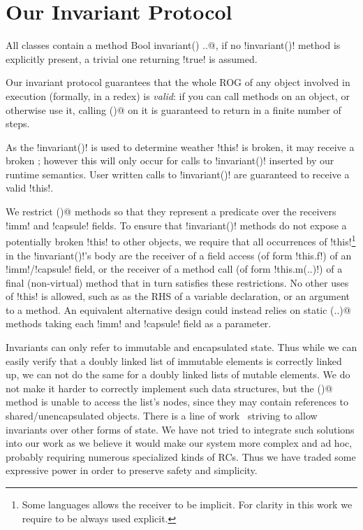 \section{Our Invariant Protocol}
\label{s:protocol}
All classes contain a \Q@read method Bool invariant() {..}@, if no \Q!invariant()! method is explicitly present, a trivial one returning \Q!true! is assumed.

Our invariant protocol guarantees that the whole ROG of any object involved in execution (formally, in a redex) is \emph{valid}: if you can call methods on an object, or otherwise use it, calling \Q@invariant()@ on it is guaranteed to return \Q@true@ in a finite number of steps.

As the \Q!invariant()! is used to determine weather \Q!this! is broken, it may receive a broken \Q@this@; however this will only occur for calls to \Q!invariant()! inserted by our runtime semantics. User written calls to \Q!invariant()! are guaranteed to receive a valid \Q!this!.

We restrict \Q@invariant()@ methods so that they represent a predicate over the receivers \Q!imm! and \Q!capsule! fields. To ensure that \Q!invariant()! methods do not expose a potentially broken \Q!this! to other objects, we require that all occurrences of \Q!this!\footnote{Some languages allows the \Q@this@ receiver to be implicit. For clarity in this work we require \Q@this@ to be always used explicit.} 
in the \Q!invariant()!'s body are the receiver of a field access (of form \Q!this.f!) of an \Q!imm!/\Q!capsule! field, or the receiver of a method call (of form \Q!this.m(..)!) of a final (non-virtual) method that in turn satisfies these restrictions. No other uses of \Q!this! is allowed, such as as the RHS of a variable declaration, or an argument to a method.
An equivalent alternative design could instead relies on static \Q@invariant(..)@ methods taking each \Q!imm! and \Q!capsule! field as a parameter.

Invariants can only refer to immutable and encapsulated state. Thus while we can easily verify that a doubly linked list of immutable elements
is correctly linked up,
we can not do the same for a doubly linked lists of mutable elements. We do not make it harder to correctly implement such data structures, 
but the \Q@invariant()@ method is unable to access the list's nodes, since they may contain \Q@mut@ references to shared/unencapsulated objects.
There is a line of work~\cite{DBLP:conf/mpc/BarnettN04} striving to allow invariants over other forms of state.
We have not tried to integrate such solutions into our work as we believe it would make our system more complex and ad hoc, probably requiring numerous specialized kinds of RCs.
Thus we have traded some expressive power in order to preserve safety and simplicity.

